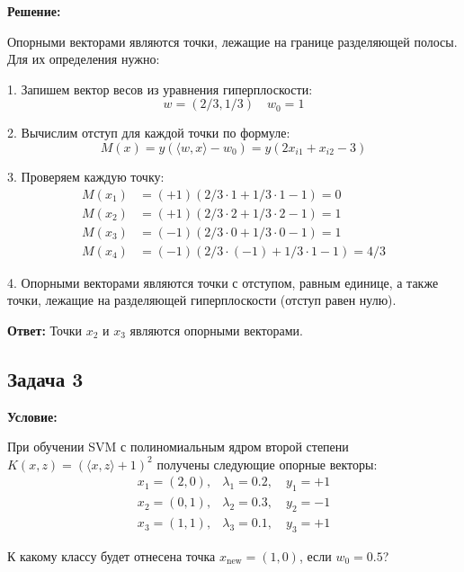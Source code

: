 \textbf{Решение:}
\par Опорными векторами являются точки, лежащие на границе разделяющей полосы. Для их определения нужно:

\par 1. Запишем вектор весов из уравнения гиперплоскости:
\begin{equation*}
    w = (2/3,1/3) \quad w_0 = 1
\end{equation*}

\par 2. Вычислим отступ для каждой точки по формуле:
\begin{equation*}
    M(x) = y(\langle w,x \rangle - w_0) = y(2x_{i1} + x_{i2} - 3)
\end{equation*}

\par 3. Проверяем каждую точку:
\begin{align*}
    M(x_1) &= (+1)(2/3 \cdot 1 + 1/3 \cdot 1 - 1) = 0 \\
    M(x_2) &= (+1)(2/3 \cdot 2 + 1/3 \cdot 2 - 1) = 1 \\
    M(x_3) &= (-1)(2/3 \cdot 0 + 1/3 \cdot 0 - 1) = 1 \\
    M(x_4) &= (-1)(2/3 \cdot (-1) + 1/3 \cdot 1 - 1) = 4/3
\end{align*}

\par 4. Опорными векторами являются точки с отступом, равным единице, а также точки, лежащие на разделяющей гиперплоскости (отступ равен нулю).

\textbf{Ответ:} Точки \(x_2\) и \(x_3\) являются опорными векторами.

\subsection{Задача 3}
\textbf{Условие:} 
\par При обучении SVM с полиномиальным ядром второй степени \(K(x,z) = (\langle x,z \rangle + 1)^2\) получены следующие опорные векторы:
\begin{equation*}
    \begin{array}{ll}
        x_1 = (2,0), & \lambda_1 = 0.2, \quad y_1 = +1 \\
        x_2 = (0,1), & \lambda_2 = 0.3, \quad y_2 = -1 \\
        x_3 = (1,1), & \lambda_3 = 0.1, \quad y_3 = +1
    \end{array}
\end{equation*}
\par К какому классу будет отнесена точка \(x_{\text{new}} = (1,0)\), если \(w_0 = 0.5\)?

